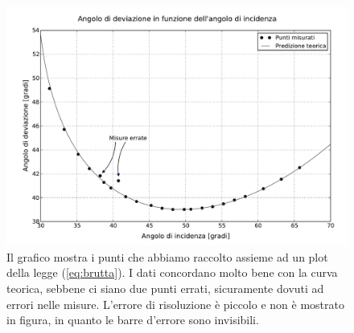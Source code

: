 \begin{figure}[b]
    \includegraphics[width=16cm]{graph.pdf}
    \caption{Il grafico mostra i punti che abbiamo raccolto assieme ad un plot della legge (\ref{eq:brutta}). I dati concordano
    molto bene con la curva teorica, sebbene ci siano due punti errati, sicuramente dovuti ad errori nelle misure. L'errore di
    risoluzione è piccolo e non è mostrato in figura, in quanto le barre d'errore sono invisibili.}
    \label{fig:dev}
\end{figure}


